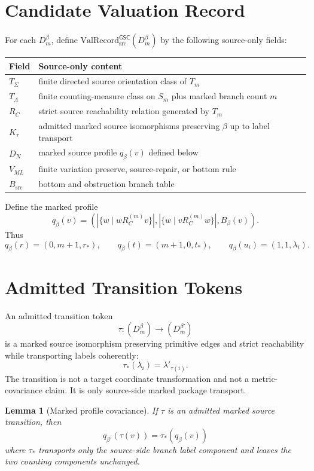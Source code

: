 \documentclass[11pt]{article}
\newcommand{\ValRecord}{\mathrm{ValRecord}_{\mathrm{src}}^{\mathsf{GSC}}}
\newcommand{\Dmbeta}{D_m^{\beta}}
\newtheorem{lemma}{Lemma}
\begin{document}
\section{Candidate Valuation Record}

For each \(\Dmbeta\), define \(\ValRecord(\Dmbeta)\) by the following
source-only fields:

\begin{longtable}{p{}p{}}
\toprule
Field & Source-only content \\
\midrule
\(T_\Sigma\) & finite directed source orientation class of \(T_m\) \\
\(T_\Lambda\) & finite counting-measure class on \(S_m\) plus marked branch count \(m\) \\
\(R_C\) & strict source reachability relation generated by \(T_m\) \\
\(K_\tau\) & admitted marked source isomorphisms preserving \(\beta\) up to label transport \\
\(D_N\) & marked source profile \(q_\beta(v)\) defined below \\
\(V_{ML}\) & finite variation preserve, source-repair, or bottom rule \\
\(B_{\mathrm{src}}\) & bottom and obstruction branch table \\
\bottomrule
\end{longtable}

Define the marked profile
\[
q_\beta(v)=
\left(
|\{w\mid wR_C^{(m)}v\}|,
|\{w\mid vR_C^{(m)}w\}|,
B_\beta(v)
\right).
\]
Thus
\[
q_\beta(r)=(0,m+1,r_\ast),\qquad
q_\beta(t)=(m+1,0,t_\ast),\qquad
q_\beta(u_i)=(1,1,\lambda_i).
\]

\section{Admitted Transition Tokens}

An admitted transition token
\[
\tau:(\Dmbeta)\to(D_m^{\beta'})
\]
is a marked source isomorphism preserving primitive edges and strict
reachability while transporting labels coherently:
\[
  \tau_\ast(\lambda_i)=\lambda'_{\tau(i)}.
\]
The transition is not a target coordinate transformation and not a
metric-covariance claim. It is only source-side marked package transport.

\begin{lemma}[Marked profile covariance]
If \(\tau\) is an admitted marked source transition, then
\[
q_{\beta'}(\tau(v))=\tau_\ast(q_\beta(v))
\]
where \(\tau_\ast\) transports only the source-side branch label component and
leaves the two counting components unchanged.
\end{lemma}
\end{document}
